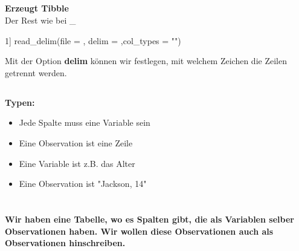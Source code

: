 \subsection{}
\textbf{Erzeugt Tibble}\\
Der Rest wie bei \_
\begin{rcode}{1]}
read_delim(file = , delim = ,col_types = "")
\end{rcode}
Mit der Option \textbf{delim} können wir festlegen, mit welchem Zeichen die Zeilen getrennt werden. 
\columnbreak
\subsection{}
\textbf{Typen:}
\begin{itemize}[noitemsep]
  \item Jede Spalte muss eine Variable sein
  \item Eine Observation ist eine Zeile
  \item Eine Variable ist z.B. das Alter
  \item Eine Observation ist "Jackson, 14"
\end{itemize}

\normalsize
\section{}
\subsection{}
\textbf{Wir haben eine Tabelle, wo es Spalten gibt, die als Variablen selber Observationen haben. Wir wollen diese Observationen auch als Observationen hinschreiben.}\\

